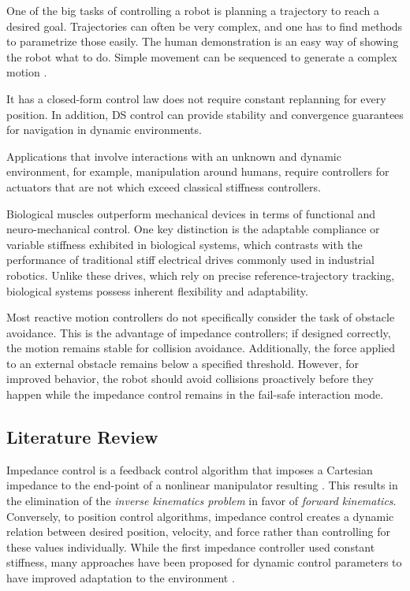 \documentclass[conference]{IEEEtran}
\begin{document}
One of the big tasks of controlling a robot is planning a trajectory to reach a desired goal. Trajectories can often be very complex, and one has to find methods to parametrize those easily. The human demonstration is an easy way of showing the robot what to do. Simple movement can be sequenced to generate a complex motion \cite{gribovskaya2011motion}.

It has a closed-form control law does not require constant replanning for every position. In addition, DS control can provide stability and convergence guarantees for navigation in dynamic environments.

Applications that involve interactions with an unknown and dynamic environment, for example, manipulation around humans, require controllers for actuators that are not which exceed classical stiffness controllers.

Biological muscles outperform mechanical devices in terms of functional and neuro-mechanical control. One key distinction is the adaptable compliance or variable stiffness exhibited in biological systems, which contrasts with the performance of traditional stiff electrical drives commonly used in industrial robotics. Unlike these drives, which rely on precise reference-trajectory tracking, biological systems possess inherent flexibility and adaptability.

Most reactive motion controllers do not specifically consider the task of obstacle avoidance. This is the advantage of impedance controllers; if designed correctly, the motion remains stable for collision avoidance. Additionally, the force applied to an external obstacle remains below a specified threshold. 
However, for improved behavior, the robot should avoid collisions proactively before they happen while the impedance control remains in the fail-safe interaction mode.



\subsection{Literature Review}
Impedance control is a feedback control algorithm that imposes a Cartesian impedance to the end-point of a nonlinear manipulator resulting \cite{hogan1985impedance}. This results in the elimination of the \textit{inverse kinematics problem} in favor of \textit{forward kinematics}.
Conversely, to position control algorithms, impedance control creates a dynamic relation between desired position, velocity, and force rather than controlling for these values individually.   
While the first impedance controller used constant stiffness, many approaches have been proposed for dynamic control parameters to have improved adaptation to the environment \cite{vanderborght2013variable, abu2020variable}. 
\end{document}
